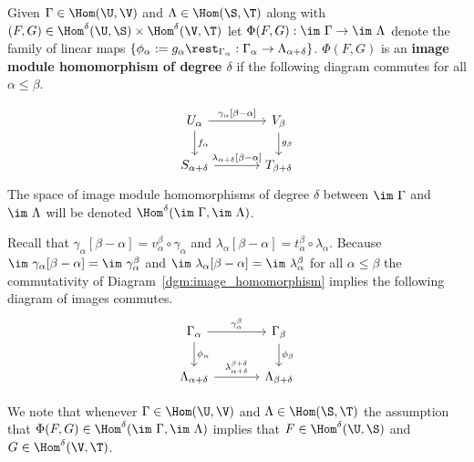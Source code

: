 \begin{definition}
  Given $\Gamma\in\Hom(\U,\V)$ and $\Lambda\in\Hom(\S,\T)$ along with $(F,G)\in\Hom^\delta(\U,\S)\times\Hom^\delta(\V,\T)$ let $\Phi(F, G) : \im~\Gamma\to\im~\Lambda$ denote the family of linear maps $\{\phi_\alpha := g_\alpha\rest_{\Gamma_\alpha} : \Gamma_\alpha\to\Lambda_{\alpha+\delta}\}$.
  $\Phi(F, G)$ is an \textbf{image module homomorphism of degree $\delta$} if the following diagram commutes for all $\alpha\leq\beta$.

  \begin{equation}\label{dgm:image_homomorphism}
    \begin{tikzcd}[column sep=large]
        U_\alpha\arrow{r}{\gamma_\alpha[\beta-\alpha]}\arrow{d}{f_\alpha} &
      V_\beta\arrow{d}{g_\beta}\\
      S_{\alpha+\delta}\arrow{r}{\lambda_{\alpha+\delta}[\beta-\alpha]} &
      T_{\beta +\delta}
  \end{tikzcd}\end{equation}
  The space of image module homomorphisms of degree $\delta$ between $\im~\Gamma$ and $\im~\Lambda$ will be denoted $\Hom^\delta(\im~\Gamma,\im~\Lambda)$.
\end{definition}

Recall that $\gamma_\alpha[\beta-\alpha] = v_\alpha^\beta\circ\gamma_\alpha$ and $\lambda_\alpha[\beta-\alpha] = t_\alpha^\beta\circ\lambda_\alpha$.
Because $\im~\gamma_\alpha[\beta-\alpha] = \im~\gamma_\alpha^\beta$ and $\im~\lambda_{\alpha}[\beta-\alpha] = \im~\lambda_\alpha^\beta$ for all $\alpha\leq\beta$ the commutativity of Diagram~\ref{dgm:image_homomorphism} implies the following diagram of images commutes.
\begin{equation}\label{dgm:shifted_homomorphism}
  \begin{tikzcd}[column sep=large]
    \Gamma_\alpha\arrow{r}{\gamma_\alpha^\beta}\arrow{d}{\phi_\alpha} &
    \Gamma_\beta\arrow{d}{\phi_\beta}\\
    \Lambda_{\alpha+\delta}\arrow{r}{\lambda_{\alpha+\delta}^{\beta+\delta}} &
    \Lambda_{\beta +\delta}
\end{tikzcd}\end{equation}

We note that whenever $\Gamma\in\Hom(\U,\V)$ and $\Lambda\in\Hom(\S,\T)$ the assumption that $\Phi(F, G)\in\Hom^\delta(\im~\Gamma, \im~\Lambda)$ implies that $F\in\Hom^\delta(\U,\S)$ and $G\in\Hom^\delta(\V,\T)$.

